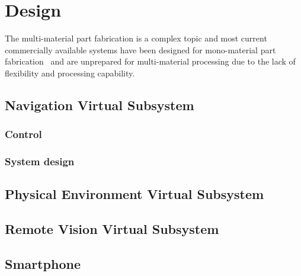 \chapter{Design}%
\label{ch:design}
  The multi-material part fabrication is a complex topic and most current
  commercially available systems have been designed for mono-material part
  fabrication~\cite{wohlers2011wohlers} and are unprepared for multi-material
  processing due to the lack of flexibility and processing capability.

\section{Navigation Virtual Subsystem}%
\label{sec:navig-virt-subsyst-design}

%
\subsection{Control}%
\label{sec:control-design}



%
\subsection{System design}%
\label{sec:navigation-system-design}

%
\section{Physical Environment Virtual Subsystem}%
\label{sec:phys-envir-virt-design}
%
%
\section{Remote Vision Virtual Subsystem}%
\label{sec:remote-visi-subsyst-design}
%
%
\section{Smartphone}%
\label{sec:smartphone-design}

%
